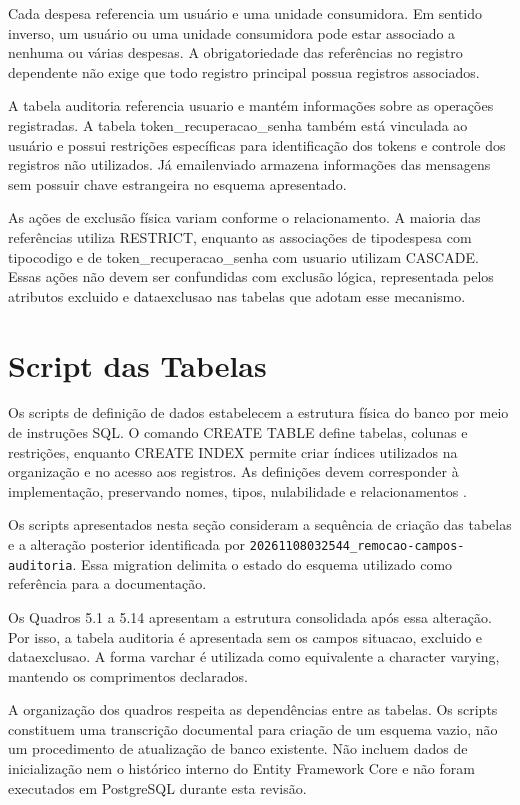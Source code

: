 Cada despesa referencia um usuário e uma unidade consumidora. Em sentido inverso, um usuário ou uma unidade consumidora pode estar associado a nenhuma ou várias despesas. A obrigatoriedade das referências no registro dependente não exige que todo registro principal possua registros associados.

A tabela auditoria referencia usuario e mantém informações sobre as operações registradas. A tabela token\_recuperacao\_senha também está vinculada ao usuário e possui restrições específicas para identificação dos tokens e controle dos registros não utilizados. Já emailenviado armazena informações das mensagens sem possuir chave estrangeira no esquema apresentado.

As ações de exclusão física variam conforme o relacionamento. A maioria das referências utiliza RESTRICT, enquanto as associações de tipodespesa com tipocodigo e de token\_recuperacao\_senha com usuario utilizam CASCADE. Essas ações não devem ser confundidas com exclusão lógica, representada pelos atributos excluido e dataexclusao nas tabelas que adotam esse mecanismo.

\section{Script das Tabelas}
\label{sec:scripts-tabelas}

Os scripts de definição de dados estabelecem a estrutura física do banco por meio de instruções SQL. O comando CREATE TABLE define tabelas, colunas e restrições, enquanto CREATE INDEX permite criar índices utilizados na organização e no acesso aos registros. As definições devem corresponder à implementação, preservando nomes, tipos, nulabilidade e relacionamentos \parencite{Machado2020}.

Os scripts apresentados nesta seção consideram a sequência de criação das tabelas e a alteração posterior identificada por \texttt{20261108032544\_remocao-campos-auditoria}. Essa migration delimita o estado do esquema utilizado como referência para a documentação.

Os Quadros 5.1 a 5.14 apresentam a estrutura consolidada após essa alteração. Por isso, a tabela auditoria é apresentada sem os campos situacao, excluido e dataexclusao. A forma varchar é utilizada como equivalente a character varying, mantendo os comprimentos declarados.

A organização dos quadros respeita as dependências entre as tabelas. Os scripts constituem uma transcrição documental para criação de um esquema vazio, não um procedimento de atualização de banco existente. Não incluem dados de inicialização nem o histórico interno do Entity Framework Core e não foram executados em PostgreSQL durante esta revisão.

